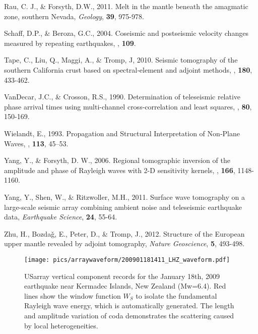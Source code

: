 \documentclass[referee]{gji}
\begin{document}
\begin{thebibliography}{}
	   Rau, C. J., \& Forsyth, D.W., 2011. Melt in the mantle beneath the amagmatic zone, southern Nevada, \textit{Geology}, \textbf{39}, 975-978.

	   Schaff, D.P., \& Beroza, G.C., 2004. Coseismic and postseismic velocity changes measured by repeating earthquakes, \textit{\jgr}, \textbf{109}.

	   Tape, C., Liu, Q., Maggi, A., \& Tromp, J, 2010. Seismic tomography of the southern California crust based on spectral‐element and adjoint methods, \textit{\gji}, \textbf{180}, 433-462.

	   VanDecar, J.C., \& Crosson, R.S., 1990. Determination of teleseismic relative phase arrival times using multi-channel cross-correlation and least squares, \textit{\bssa}, \textbf{80}, 150-169.

	   Wielandt, E., 1993. Propagation and Structural Interpretation of Non‐Plane Waves, \textit{\gji}, \textbf{113}, 45–53.

	   Yang, Y., \& Forsyth, D. W., 2006. Regional tomographic inversion of the amplitude and phase of Rayleigh waves with 2-D sensitivity kernels, \textit{\gji}, \textbf{166}, 1148-1160.

	   Yang, Y., Shen, W., \& Ritzwoller, M.H., 2011. Surface wave tomography on a large-scale seismic array combining ambient noise and teleseismic earthquake data, \textit{Earthquake Science}, \textbf{24}, 55-64.

	   Zhu, H., Bozda\v{g}, E., Peter, D., \& Tromp, J., 2012. Structure of the European upper mantle revealed by adjoint tomography, \textit{Nature Geoscience}, \textbf{5}, 493-498.

\end{thebibliography}

\begin{figure}
	\texttt{[image: pics/arraywaveform/200901181411\_LHZ\_waveform.pdf]}	
	\caption{USarray vertical component records for the January 18th, 2009 earthquake near Kermadec Islands, New Zealand (Mw=6.4). Red lines show the window function $W_S$ to isolate the fundamental Rayleigh wave energy, which is automatically generated. The length and amplitude variation of coda demonstrates the scattering caused by local heterogeneities.}
	\label{fig:arraywaveform}
\end{figure}
\end{document}
